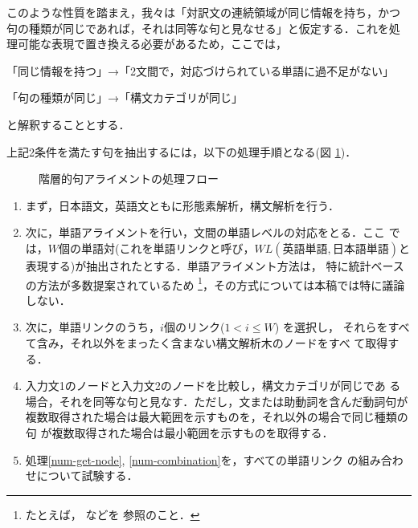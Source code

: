 このような性質を踏まえ，我々は「対訳文の連続領域が同じ情報を持ち，かつ
句の種類が同じであれば，それは同等な句と見なせる」と仮定する．これを処
理可能な表現で置き換える必要があるため，ここでは，

\begin{conditionlist}
\item 「同じ情報を持つ」→「2文間で，対応づけられている単語に過不足がない」
\label{cond-same-information}
\item 「句の種類が同じ」→「構文カテゴリが同じ」
\label{cond-same-category}
\end{conditionlist}

\noindent
と解釈することとする．

上記2条件を満たす句を抽出するには，以下の処理手順となる(図
\ref{fig-proc})．

\begin{figure}
\begin{center}
\caption{階層的句アライメントの処理フロー}\label{fig-proc}
\end{center}
\end{figure}

\begin{enumerate}
\item まず，日本語文，英語文ともに形態素解析，構文解析を行う．

\item 次に，単語アライメントを行い，文間の単語レベルの対応をとる．ここ
では，$W$個の単語対(これを単語リンクと呼び，$WL(\mbox{英語単語},\mbox
{日本語単語})$と表現する)が抽出されたとする．単語アライメント方法は，
特に統計ベースの方法が多数提案されているため
\footnote{たとえば，
などを
参照のこと．}，その方式については本稿では特に議論しない．

\item 次に，単語リンクのうち，$i$個のリンク($1 < i \leq W$) を選択し，
それらをすべて含み，それ以外をまったく含まない構文解析木のノードをすべ
て取得する．\label{num-get-node}

\item 入力文1のノードと入力文2のノードを比較し，構文カテゴリが同じであ
る場合，それを同等な句と見なす．ただし，文または助動詞を含んだ動詞句が
複数取得された場合は最大範囲を示すものを，それ以外の場合で同じ種類の句
が複数取得された場合は最小範囲を示すものを取得する．
\label{num-combination}

\item 処理\ref{num-get-node}, \ref{num-combination}を，すべての単語リンク
の組み合わせについて試験する．
\end{enumerate}

